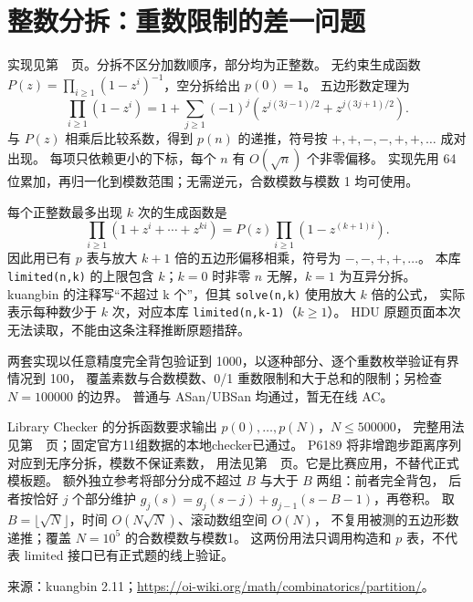 \section{整数分拆：重数限制的差一问题}
实现见第~\pageref{compact-Partitions}~页。分拆不区分加数顺序，部分均为正整数。
无约束生成函数 $P(z)=\prod_{i\ge1}(1-z^i)^{-1}$，空分拆给出 $p(0)=1$。
五边形数定理为
\[
\prod_{i\ge1}(1-z^i)=1+\sum_{j\ge1}(-1)^j
\left(z^{j(3j-1)/2}+z^{j(3j+1)/2}\right).
\]
与 $P(z)$ 相乘后比较系数，得到 $p(n)$ 的递推，符号按 $+,+,-,-,+,+,\ldots$ 成对出现。
每项只依赖更小的下标，每个 $n$ 有 $O(\sqrt n)$ 个非零偏移。
实现先用 64 位累加，再归一化到模数范围；无需逆元，合数模数与模数 1 均可使用。

每个正整数最多出现 $k$ 次的生成函数是
\[
\prod_{i\ge1}(1+z^i+\cdots+z^{ki})
=P(z)\prod_{i\ge1}(1-z^{(k+1)i}).
\]
因此用已有 $p$ 表与放大 $k+1$ 倍的五边形偏移相乘，符号为 $-,-,+,+,\ldots$。
本库 \texttt{limited(n,k)} 的上限包含 $k$；$k=0$ 时非零 $n$ 无解，$k=1$ 为互异分拆。
kuangbin 的注释写“不超过 k 个”，但其 \texttt{solve(n,k)} 使用放大 $k$ 倍的公式，
实际表示每种数少于 $k$ 次，对应本库 \texttt{limited(n,k-1)}（$k\ge1$）。
HDU 原题页面本次无法读取，不能由这条注释推断原题措辞。

两套实现以任意精度完全背包验证到 1000，以逐种部分、逐个重数枚举验证有界情况到 100，
覆盖素数与合数模数、0/1 重数限制和大于总和的限制；另检查 $N=100000$ 的边界。
普通与 ASan/UBSan 均通过，暂无在线 AC。


Library Checker 的分拆函数要求输出 $p(0),\ldots,p(N)$，$N\le500000$，
完整用法见第~\pageref{usage-example-158}~页；固定官方11组数据的本地checker已通过。
P6189 将非增跑步距离序列对应到无序分拆，模数不保证素数，
用法见第~\pageref{usage-example-159}~页。它是比赛应用，不替代正式模板题。
额外独立参考将部分分成不超过 $B$ 与大于 $B$ 两组：前者完全背包，
后者按恰好 $j$ 个部分维护 $g_j(s)=g_j(s-j)+g_{j-1}(s-B-1)$，再卷积。
取 $B=\lfloor\sqrt N\rfloor$，时间 $O(N\sqrt N)$、滚动数组空间 $O(N)$，
不复用被测的五边形数递推；覆盖 $N=10^5$ 的合数模数与模数1。
这两份用法只调用构造和 $p$ 表，不代表 limited 接口已有正式题的线上验证。

来源：kuangbin 2.11；\url{https://oi-wiki.org/math/combinatorics/partition/}。

